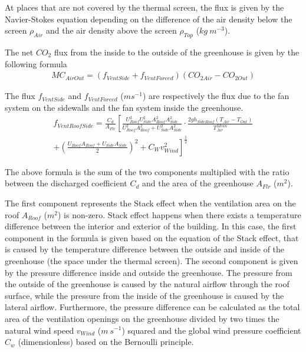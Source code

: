 \documentclass[a4paper]{article}
\numberwithin{equation}{section}
\begin{document}
At places that are not covered by the thermal screen, the flux is given by the Navier-Stokes equation depending on the difference of the air density below the screen \( \rho_{Air} \) and the air density above the screen \( \rho_{Top} \) (\( kg\ m^{-3} \)).

The net \( CO_2 \) flux from the inside to the outside of the greenhouse is given by the following formula
\begin{align}
  MC_{AirOut} = (f_{VentSide} + f_{VentForced})(CO_{2 Air} - CO_{2 Out})
\end{align}

The flux \( f_{VentSide} \) and \( f_{VentForced} \) (\( m s^{-1} \)) are respectively the flux due to the fan system on the sidewalls and the fan system inside the greenhouse.
\begin{multline}
  \label{eq:vent_roof_side}
  f_{VentRoofSide} = \frac{C_d}{A_{Flr}} \left[\frac{U_{Roof}^2 U_{Side}^2 A_{Roof}^2 A_{Side}^2}{U_{Roof}^2 A_{Roof}^2 + U_{Side}^2 A_{Side}^2} \cdot \frac{2gh_{SideRoof} (T_{Air} - T_{Out})}{T_{Air}^{Mean}}\right. \\
  + \left.{ \left(\frac{U_{Roof} A_{Roof} + U_{Side} A_{Side}}{2}\right)}^2 + C_W v_{Wind}^2\right]^{\frac{1}{2}}
\end{multline}

The above formula is the sum of the two components multiplied with the ratio between the discharged coefficient \( C_d \) and the area of the greenhouse \( A_{Flr} \) (\( m^2 \)).

The first component represents the Stack effect when the ventilation area on the roof \( A_{Roof} \) (\( m^2 \)) is non-zero. Stack effect happens when there exists a temperature difference between the interior and exterior of the building. In this case, the first component in the formula is given based on the equation of the Stack effect, that is caused by the temperature difference between the outside and inside of the greenhouse (the space under the thermal screen).
The second component is given by the pressure difference inside and outside the greenhouse. The pressure from the outside of the greenhouse is caused by the natural airflow through the roof surface, while the pressure from the inside of the greenhouse is caused by the lateral airflow. Furthermore, the pressure difference can be calculated as the total area of the ventilation openings on the greenhouse divided by two times the natural wind speed \( v_{Wind} \) (\( m\ s^{-1} \)) squared and the global wind pressure coefficient \( C_w \) (dimensionless) based on the Bernoulli principle.
\end{document}
